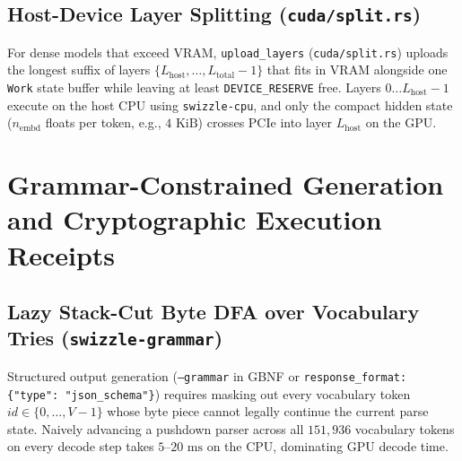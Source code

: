 \documentclass[10pt,a4paper]{article}
\theoremstyle{swzstyle}
\newcommand{\code}[1]{\texttt{#1}}
\begin{document}
\subsection{Host-Device Layer Splitting (\texttt{cuda/split.rs})}

For dense models that exceed VRAM, \code{upload\_layers} (\code{cuda/split.rs}) uploads the longest suffix of layers $\{L_{\text{host}}, \dots, L_{\text{total}}-1\}$ that fits in VRAM alongside one \code{Work} state buffer while leaving at least \code{DEVICE\_RESERVE} free. Layers $0 \dots L_{\text{host}}-1$ execute on the host CPU using \code{swizzle-cpu}, and only the compact hidden state ($n_{\text{embd}}$ floats per token, e.g., $4\text{ KiB}$) crosses PCIe into layer $L_{\text{host}}$ on the GPU.

\section{Grammar-Constrained Generation and Cryptographic Execution Receipts}

\subsection{Lazy Stack-Cut Byte DFA over Vocabulary Tries (\texttt{swizzle-grammar})}

Structured output generation (\code{--grammar} in GBNF or \code{response\_format: \{"type": "json\_schema"\}}) requires masking out every vocabulary token $id \in \{0, \dots, V-1\}$ whose byte piece cannot legally continue the current parse state. Naively advancing a pushdown parser across all $151,936$ vocabulary tokens on every decode step takes $5\text{--}20\text{ ms}$ on the CPU, dominating GPU decode time.
\end{document}
